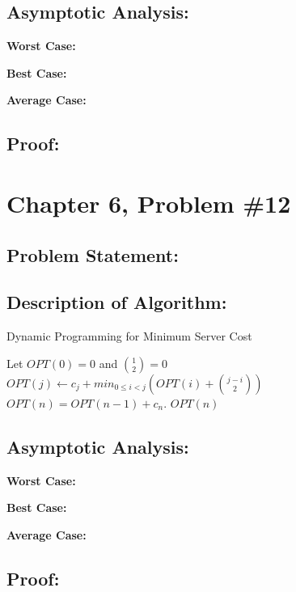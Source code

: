 \documentclass{article}
\begin{document}
\subsection*{Asymptotic Analysis:}
\noindent \textbf{Worst Case:}

\noindent \textbf{Best Case:}

\noindent \textbf{Average Case:}

\subsection*{Proof:}

\newpage

\section*{Chapter 6, Problem \#12}

\subsection*{Problem Statement:}  

\subsection*{Description of Algorithm:}

\begin{algorithm}
\caption{Dynamic Programming for Minimum Server Cost}
\begin{algorithmic}
\State Let $OPT(0) = 0$ and $\binom{1}{2} = 0$
	\State $OPT(j) \gets c_j + min_{0 \leq i < j}(OPT(i) + \binom{j-i}{2} )$
\EndFor
\State $OPT(n) = OPT(n-1) + c_n$.
\State \Return $OPT(n)$
\end{algorithmic}
\end{algorithm}

\subsection*{Asymptotic Analysis:}
\noindent \textbf{Worst Case:}

\noindent \textbf{Best Case:}

\noindent \textbf{Average Case:}

\subsection*{Proof:}

\printbibliography
\end{document}
